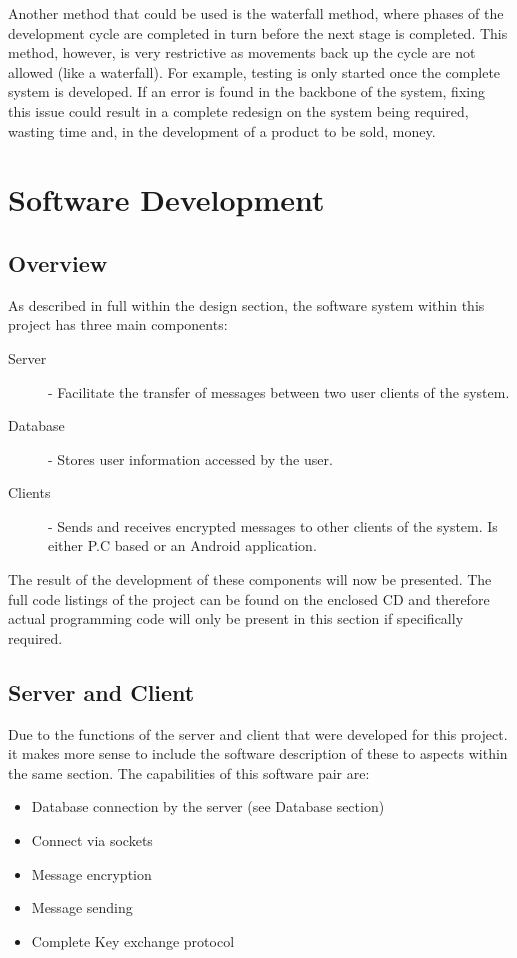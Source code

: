 \documentclass[a4paper,12pt]{report}
\begin{document}
Another method that could be used is the waterfall method, where phases of the development cycle are completed in turn before the next stage is completed. This method, however, is very restrictive as movements back up the cycle are not allowed (like a waterfall). For example, testing is only started once the complete system is developed. If an error is found in the backbone of the system, fixing this issue could result in a complete redesign on the system being required, wasting time and, in the development of a product to be sold, money. 

\section{Software Development}

\subsection{Overview}

As described in full within the design section, the software system within this project has three main components:

\begin{description}
 \item[Server] - Facilitate the transfer of messages between two user clients of the system.
 \item[Database] - Stores user information accessed by the user.
 \item[Clients] - Sends and receives encrypted messages to other clients of the system. Is either P.C based or an Android application.
\end{description}

The result of the development of these components will now be presented. The full code listings of the project can be found on the enclosed CD and therefore actual programming code will only be present in this section if specifically required. 

\subsection{Server and Client}

Due to the functions of the server and client that were developed for this project. it makes more sense to include the software description of these to aspects within the same section. The capabilities of this software pair are:

\begin{itemize}
 \item Database connection by the server (see Database section)
 \item Connect via sockets
 \item Message encryption
 \item Message sending
 \item Complete Key exchange protocol
\end{itemize}
\end{document}
